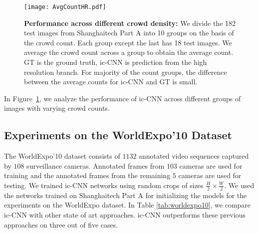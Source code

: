 \documentclass[runningheads]{llncs}
\begin{document}
\begin{figure}[!thb]
\centering
\texttt{[image: AvgCountHR.pdf]}

	\caption{\textbf{Performance across different crowd density:} We divide the 182 test images from Shanghaitech Part A into 10 groups on the basis of the crowd count. Each group except the last has 18 test images. We average the crowd count across a group to obtain the average count. GT is the ground truth, ic-CNN is prediction from the high resolution branch. For majority of the count groups, the difference between the average counts for ic-CNN and GT is small.\label{fig:avgcount}}	
\end{figure}
In Figure~\ref{fig:avgcount}, we analyze the performance of ic-CNN across different groups of images with varying crowd counts.
\subsection{Experiments on the WorldExpo'10 Dataset} 
The WorldExpo'10 dataset consists of $1132$ annotated video sequences captured by $108$ surveillance cameras. Annotated frames from $103$ cameras are used for training and the annotated frames from the remaining $5$ cameras are used for testing. We trained ic-CNN networks using random crops of sizes $\frac{H}{2}\times\frac{W}{2}$. We used the networks trained on Shanghaitech Part A for initializing the models for the experiments on the WorldExpo dataset. In Table \ref{tab:worldexpo10}, we compare ic-CNN with other state of art approaches. ic-CNN outperforms these previous approaches on three out of five cases. 
\end{document}
